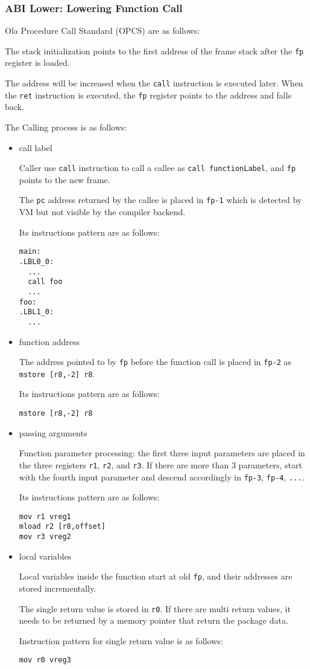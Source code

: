 \subsubsection{ABI Lower: Lowering Function Call}
    
Ola Procedure Call Standard (OPCS) are as follows:

The stack initialization points to the first address of the frame stack after the \texttt{fp} register is loaded.
    
The address will be increased when the \texttt{call} instruction is executed later.
When the \texttt{ret} instruction is executed, the \texttt{fp} register points to the address and falls back.
    
    
The Calling process is as follows:
\begin{itemize}
    \item call label

Caller use \texttt{call} instruction to call a callee as \texttt{call functionLabel}, and \texttt{fp} points to the new frame.\par
The \texttt{pc} address returned by the callee is placed in \texttt{fp-1} which is detected by VM but not visible by the compiler backend.\par
Its instructions pattern are as follows:
\begin{lstlisting}[language={}]
main:
.LBL0_0:
  ...
  call foo
  ...
foo:
.LBL1_0:
  ...
\end{lstlisting}
    \item function address

The address pointed to by \texttt{fp} before the function call is placed in \texttt{fp-2} as \texttt{mstore [r8,-2] r8}.\par
Its instructions pattern are as follows:
\begin{lstlisting}[language={}]
mstore [r8,-2] r8
\end{lstlisting}
    \item passing arguments

Function parameter processing: the first three input parameters are placed in the three registers \texttt{r1}, \texttt{r2}, and \texttt{r3}.
If there are more than 3 parameters, start with the fourth input parameter and descend accordingly in \texttt{fp-3}, \texttt{fp-4}, \texttt{...}. \par
Its instructions pattern are as follows:
\begin{lstlisting}[language={}]
mov r1 vreg1
mload r2 [r8,offset]
mov r3 vreg2
\end{lstlisting}
    \item  local variables

Local variables inside the function start at old \texttt{fp}, and their addresses are stored incrementally.

The single return value is stored in \texttt{r0}. If there are multi return values, it needs to be returned by a memory pointer that return the package data.\par
Instruction pattern for single return value is as follows:
\begin{lstlisting}[language={}]
mov r0 vreg3
\end{lstlisting}
\end{itemize}

